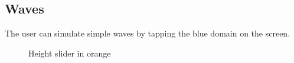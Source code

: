 \documentclass[11pt,a4paper]{article}
\begin{document}
\subsection{Waves}
The user can simulate simple waves by tapping the blue domain on the screen.


\begin{figure}[H]
\caption{Height slider in orange}
\end{figure}
\end{document}
